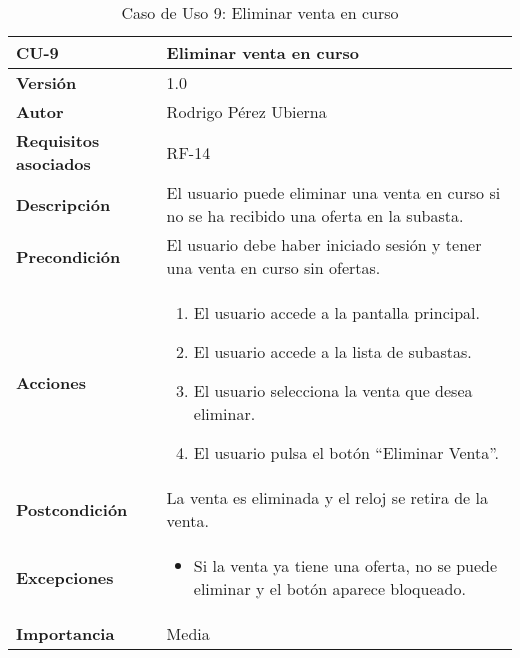 \begin{table}[p]
	\centering
	\begin{tabularx}{\linewidth}{ p{} p{} }
		\toprule
		\textbf{CU-9} & \textbf{Eliminar venta en curso}\\
		\toprule
		\textbf{Versión} & 1.0 \\
		\textbf{Autor} & Rodrigo Pérez Ubierna \\
		\textbf{Requisitos asociados} & RF-14 \\
		\textbf{Descripción} & El usuario puede eliminar una venta en curso si no se ha recibido una oferta en la subasta. \\
		\textbf{Precondición} & El usuario debe haber iniciado sesión y tener una venta en curso sin ofertas. \\
		\textbf{Acciones} &
		\begin{enumerate}
			\def\labelenumi{\arabic{enumi}.}
			\tightlist
			\item El usuario accede a la pantalla principal.
			\item El usuario accede a la lista de subastas.
			\item El usuario selecciona la venta que desea eliminar.
			\item El usuario pulsa el botón ``Eliminar Venta''.
		\end{enumerate}\\
		\textbf{Postcondición} & La venta es eliminada y el reloj se retira de la venta. \\
		\textbf{Excepciones} &
			\begin{itemize}
				\item Si la venta ya tiene una oferta, no se puede eliminar y el botón aparece bloqueado.
			\end{itemize} \\
		\textbf{Importancia} & Media \\
		\bottomrule
	\end{tabularx}
	\caption{Caso de Uso 9: Eliminar venta en curso}
\end{table}

